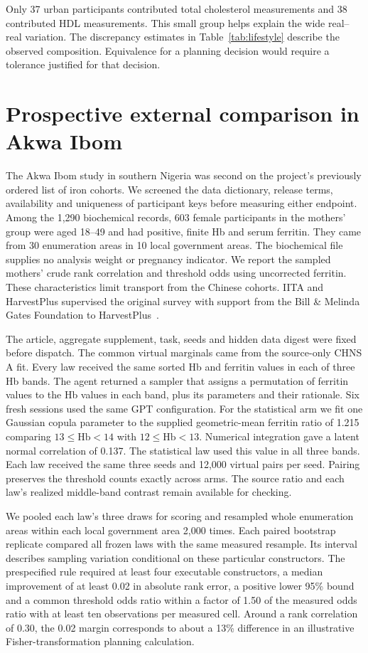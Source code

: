 Only 37 urban participants contributed total cholesterol measurements and 38 contributed HDL measurements. This small group helps explain the wide real--real variation. The discrepancy estimates in Table~\ref{tab:lifestyle} describe the observed composition. Equivalence for a planning decision would require a tolerance justified for that decision.

\section{Prospective external comparison in Akwa Ibom}
\label{app:akwa}
The Akwa Ibom study in southern Nigeria was second on the project's previously ordered list of iron cohorts. We screened the data dictionary, release terms, availability and uniqueness of participant keys before measuring either endpoint. Among the 1,290 biochemical records, 603 female participants in the mothers' group were aged 18--49 and had positive, finite Hb and serum ferritin. They came from 30 enumeration areas in 10 local government areas. The biochemical file supplies no analysis weight or pregnancy indicator. We report the sampled mothers' crude rank correlation and threshold odds using uncorrected ferritin. These characteristics limit transport from the Chinese cohorts. IITA and HarvestPlus supervised the original survey with support from the Bill \& Melinda Gates Foundation to HarvestPlus~\cite{akwa_iron}.

The article, aggregate supplement, task, seeds and hidden data digest were fixed before dispatch. The common virtual marginals came from the source-only CHNS A fit. Every law received the same sorted Hb and ferritin values in each of three Hb bands. The agent returned a sampler that assigns a permutation of ferritin values to the Hb values in each band, plus its parameters and their rationale. Six fresh sessions used the same GPT configuration. For the statistical arm we fit one Gaussian copula parameter to the supplied geometric-mean ferritin ratio of 1.215 comparing $13\leq\mathrm{Hb}<14$ with $12\leq\mathrm{Hb}<13$. Numerical integration gave a latent normal correlation of 0.137. The statistical law used this value in all three bands. Each law received the same three seeds and 12,000 virtual pairs per seed. Pairing preserves the threshold counts exactly across arms. The source ratio and each law's realized middle-band contrast remain available for checking.

We pooled each law's three draws for scoring and resampled whole enumeration areas within each local government area 2,000 times. Each paired bootstrap replicate compared all frozen laws with the same measured resample. Its interval describes sampling variation conditional on these particular constructors. The prespecified rule required at least four executable constructors, a median improvement of at least 0.02 in absolute rank error, a positive lower 95\% bound and a common threshold odds ratio within a factor of 1.50 of the measured odds ratio with at least ten observations per measured cell. Around a rank correlation of 0.30, the 0.02 margin corresponds to about a 13\% difference in an illustrative Fisher-transformation planning calculation.

